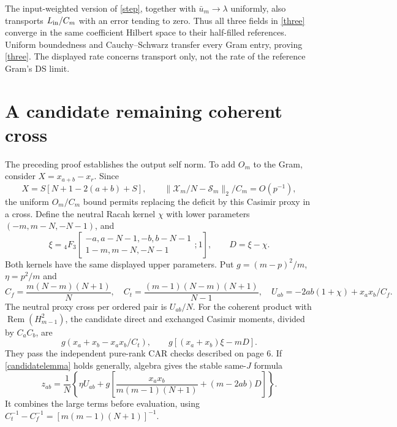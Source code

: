 \documentclass[11pt,a4paper]{article}
\newcommand{\Rem}{\operatorname{Rem}}
\begin{document}
The input-weighted version of \eqref{step}, together with
$\bar u_m\to\lambda$ uniformly, also transports $L_{\rm in}/C_m$
with an error tending to zero. Thus all three fields in \eqref{three}
converge in the same coefficient Hilbert space to their half-filled
references. Uniform boundedness and Cauchy--Schwarz transfer every
Gram entry, proving \eqref{three}. The displayed rate concerns
transport only, not the rate of the reference Gram's DS limit.

\newpage
\section{A candidate remaining coherent cross}
The preceding proof establishes the output self norm. To add $O_m$
to the Gram, consider $X=x_{a+b}-x_r$. Since
\begin{equation}
 X=S[N+1-2(a+b)+S],\qquad
 \|\mathcal X_m/N-\mathcal S_m\|_2/C_m=O(p^{-1}),\label{proxy}
\end{equation}
the uniform $O_m/C_m$ bound permits replacing the deficit by this
Casimir proxy in a cross. Define the neutral Racah kernel $\chi$
with lower parameters $(-m,m-N,-N-1)$, and
\begin{equation}
 \xi={}_4F_3\!\left[\begin{matrix}-a,a-N-1,-b,b-N-1\\
 1-m,m-N,-N-1\end{matrix};1\right],\qquad D=\xi-\chi.
\end{equation}
Both kernels have the same displayed upper parameters. Put
$g=(m-p)^2/m$, $\eta=p^2/m$ and
\begin{equation}
 C_f=\frac{m(N-m)(N+1)}N,\quad
 C_t=\frac{(m-1)(N-m)(N+1)}{N-1},\quad
 U_{ab}=-2ab(1+\chi)+x_ax_b/C_f.
\end{equation}
The neutral proxy cross per ordered pair is $U_{ab}/N$.
For the coherent product with $\Rem(H_{m-1}^2)$, the candidate
direct and exchanged Casimir moments, divided by $C_aC_b$, are
\begin{equation}
 g(x_a+x_b-x_ax_b/C_t),\qquad
 g[(x_a+x_b)\xi-mD].\label{candidatelemma}
\end{equation}
They pass the independent pure-rank CAR checks described on page 6.
If \eqref{candidatelemma} holds generally, algebra gives the stable
same-$J$ formula
\begin{equation}
 z_{ab}=\frac1N\left\{\eta U_{ab}
 +g\left[\frac{x_ax_b}{m(m-1)(N+1)}+(m-2ab)D\right]\right\}.
 \label{candidate}
\end{equation}
It combines the large terms before evaluation, using
$C_t^{-1}-C_f^{-1}=[m(m-1)(N+1)]^{-1}$.
\end{document}
